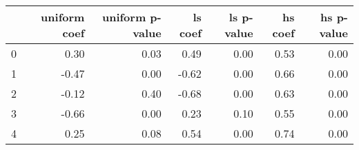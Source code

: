 \begin{tabular}{lrrrrrr}
\toprule
 & uniform coef & uniform p-value & ls coef & ls p-value & hs coef & hs p-value \\
\midrule
0 & 0.30 & 0.03 & 0.49 & 0.00 & 0.53 & 0.00 \\
1 & -0.47 & 0.00 & -0.62 & 0.00 & 0.66 & 0.00 \\
2 & -0.12 & 0.40 & -0.68 & 0.00 & 0.63 & 0.00 \\
3 & -0.66 & 0.00 & 0.23 & 0.10 & 0.55 & 0.00 \\
4 & 0.25 & 0.08 & 0.54 & 0.00 & 0.74 & 0.00 \\
\bottomrule
\end{tabular}
